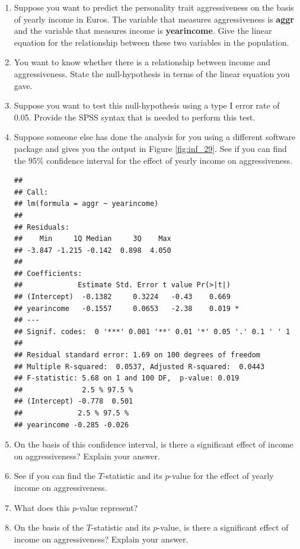 \documentclass[]{report}\usepackage[]{graphicx}\usepackage[]{color}
\makeatletter
\newenvironment{kframe}{%
 \def\at@end@of@kframe{}%
 \ifinner\ifhmode%
  \def\at@end@of@kframe{\end{minipage}}%
  \begin{minipage}{\columnwidth}%
 \fi\fi%
 \def\FrameCommand##1{\hskip\@totalleftmargin \hskip-\fboxsep
 \colorbox{shadecolor}{##1}\hskip-\fboxsep
     \hskip-\linewidth \hskip-\@totalleftmargin \hskip\columnwidth}%
 \MakeFramed {\advance\hsize-\width
   \@totalleftmargin\z@ \linewidth\hsize
   \@setminipage}}%
 {\par\unskip\endMakeFramed%
 \at@end@of@kframe}
\newenvironment{knitrout}{}{} %
\makeatother
\begin{document}
\begin{enumerate}
\item Suppose you want to predict the personality trait aggressiveness on the basis of yearly income in Euros. The variable that measures aggressiveness is \textbf{aggr} and the variable that measures income is \textbf{yearincome}. Give the linear equation for the relationship between these two variables in the population.

\item You want to know whether there is a relationship between income and aggressiveness. State the null-hypothesis in terms of the linear equation you gave.

\item Suppose you want to test this null-hypothesis using a type I error rate of 0.05. Provide the SPSS syntax that is needed to perform this test.

\item Suppose someone else has done the analysis for you using a different software package and gives you the output in Figure \ref{fig:inf_29}. See if you can find the 95\% confidence interval for the effect of yearly income on aggressiveness.

\begin{knitrout}
\color{fgcolor}\begin{kframe}
\begin{verbatim}
## 
## Call:
## lm(formula = aggr ~ yearincome)
## 
## Residuals:
##    Min     1Q Median     3Q    Max 
## -3.847 -1.215 -0.142  0.898  4.050 
## 
## Coefficients:
##             Estimate Std. Error t value Pr(>|t|)  
## (Intercept)  -0.1382     0.3224   -0.43    0.669  
## yearincome   -0.1557     0.0653   -2.38    0.019 *
## ---
## Signif. codes:  0 '***' 0.001 '**' 0.01 '*' 0.05 '.' 0.1 ' ' 1
## 
## Residual standard error: 1.69 on 100 degrees of freedom
## Multiple R-squared:  0.0537,	Adjusted R-squared:  0.0443 
## F-statistic: 5.68 on 1 and 100 DF,  p-value: 0.019
##              2.5 % 97.5 %
## (Intercept) -0.778  0.501
##             2.5 % 97.5 %
## yearincome -0.285 -0.026
\end{verbatim}
\end{kframe}
\end{knitrout}


\item On the basis of this confidence interval, is there a significant effect of income on aggressiveness? Explain your answer.

\item See if you can find the $T$-statistic and its $p$-value for the effect of yearly income on aggressiveness.

\item What does this $p$-value represent?

\item On the basis of the $T$-statistic and its $p$-value, is there a significant effect of income on aggressiveness? Explain your answer.


\end{enumerate}
\end{document}
